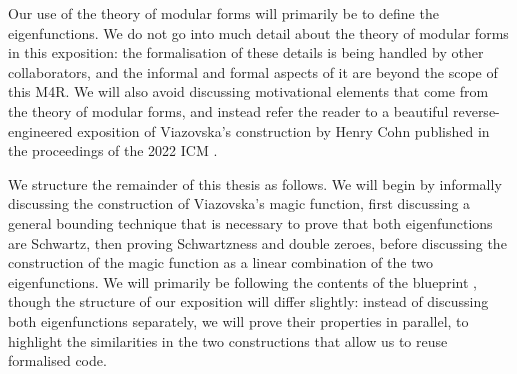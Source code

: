 Our use of the theory of modular forms will primarily be to define the eigenfunctions. We do not go into much detail about the theory of modular forms in this exposition: the formalisation of these details is being handled by other collaborators, and the informal and formal aspects of it are beyond the scope of this M4R. We will also avoid discussing motivational elements that come from the theory of modular forms, and instead refer the reader to a beautiful reverse-engineered exposition of Viazovska's construction by Henry Cohn published in the proceedings of the 2022 ICM \cite{CohnOnViazovskaICM}.

We structure the remainder of this thesis as follows. We will begin by informally discussing the construction of Viazovska's magic function, first discussing a general bounding technique that is necessary to prove that both eigenfunctions are Schwartz, then proving Schwartzness and double zeroes, before discussing the construction of the magic function as a linear combination of the two eigenfunctions. We will primarily be following the contents of the blueprint \cite{blueprint}, though the structure of our exposition will differ slightly: instead of discussing both eigenfunctions separately, we will prove their properties in parallel, to highlight the similarities in the two constructions that allow us to reuse formalised code.